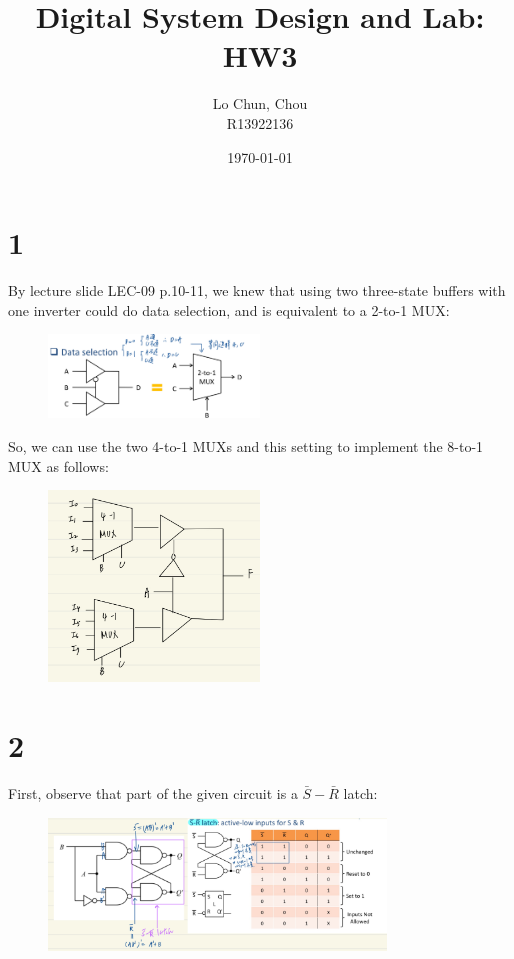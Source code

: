 \documentclass{article}
\title{Digital System Design and Lab: HW3}
\author{Lo Chun, Chou \\ R13922136}
\date\today
\begin{document}
\setlength{\parindent}{0pt}
\maketitle 

\section*{1}

By lecture slide LEC-09 p.10-11, 
we knew that using two three-state buffers with one inverter could do data selection, 
and is equivalent to a 2-to-1 MUX:

\begin{figure}[h]
    \centering
    \includegraphics[width=0.5\textwidth]{1_three_state_buffer_w_inverter.jpeg}
\end{figure}

So, we can use the two 4-to-1 MUXs and this setting to implement the 8-to-1 MUX as follows:

\begin{figure}[h]
    \centering
    \includegraphics[width=0.5\textwidth]{1_sol.jpeg}
\end{figure}

\section*{2}

First, observe that part of the given circuit is a $\bar{S}-\bar{R}$ latch:

\begin{figure}[h]
    \centering
    \includegraphics[width=0.8\textwidth]{2_Sbar_Rbar_latch.jpeg}
\end{figure}
\end{document}
